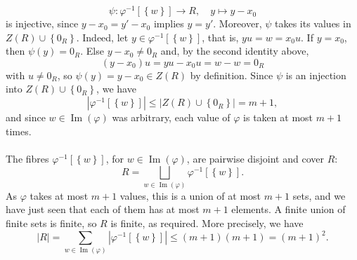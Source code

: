 \begin{solution}
    \[
        \psi \colon \varphi^{-1}\left[\left\{w\right\}\right] \to R, \quad y \mapsto y - x_0
    \]
    is injective, since \( y - x_0 = y' - x_0 \) implies \( y = y' \). Moreover, \( \psi \) takes its values in \( Z\left(R\right) \cup \left\{0_R\right\} \). Indeed, let \( y \in \varphi^{-1}\left[\left\{w\right\}\right] \), that is, \( yu = w = x_0 u \). If \( y = x_0 \), then \( \psi\left(y\right) = 0_R \). Else \( y - x_0 \neq 0_R \) and, by the second identity above,
    \[
        \left(y - x_0\right)u = yu - x_0 u = w - w = 0_R
    \]
    with \( u \neq 0_R \), so \( \psi\left(y\right) = y - x_0 \in Z\left(R\right) \) by definition. Since \( \psi \) is an injection into \( Z\left(R\right) \cup \left\{0_R\right\} \), we have
    \[
        \left|\varphi^{-1}\left[\left\{w\right\}\right]\right| \leq \left|Z\left(R\right) \cup \left\{0_R\right\}\right| = m + 1,
    \]
    and since \( w \in \operatorname{Im}\left(\varphi\right) \) was arbitrary, each value of \( \varphi \) is taken at most \( m + 1 \) times.
    \\\\
    The fibres \( \varphi^{-1}\left[\left\{w\right\}\right] \), for \( w \in \operatorname{Im}\left(\varphi\right) \), are pairwise disjoint and cover \( R \):
    \[
        R = \bigsqcup_{w \in \operatorname{Im}\left(\varphi\right)} \varphi^{-1}\left[\left\{w\right\}\right].
    \]
    As \( \varphi \) takes at most \( m + 1 \) values, this is a union of at most \( m + 1 \) sets, and we have just seen that each of them has at most \( m + 1 \) elements. A finite union of finite sets is finite, so \( R \) is finite, as required. More precisely, we have
    \[
        \left|R\right| = \sum_{w \in \operatorname{Im}\left(\varphi\right)} \left|\varphi^{-1}\left[\left\{w\right\}\right]\right| \leq \left(m + 1\right)\left(m + 1\right) = \left(m + 1\right)^2.
    \]
\end{solution}
